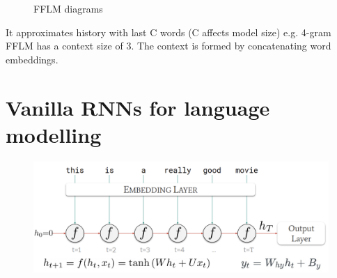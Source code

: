 \documentclass[11pt]{article}
\begin{document}
\begin{figure}[H]
    \centering
    \caption{FFLM diagrams}\label{fig:fflm}
\end{figure}

It approximates history with last C words (C affects model size) e.g. 4-gram FFLM has a context size of 3. The context is formed by concatenating word embeddings.

\section{Vanilla RNNs for language modelling}

\begin{figure}[H]
    \centering
    \includegraphics[width=\linewidth]{figures/Rnn-architecture.png}
\end{figure}
\end{document}
